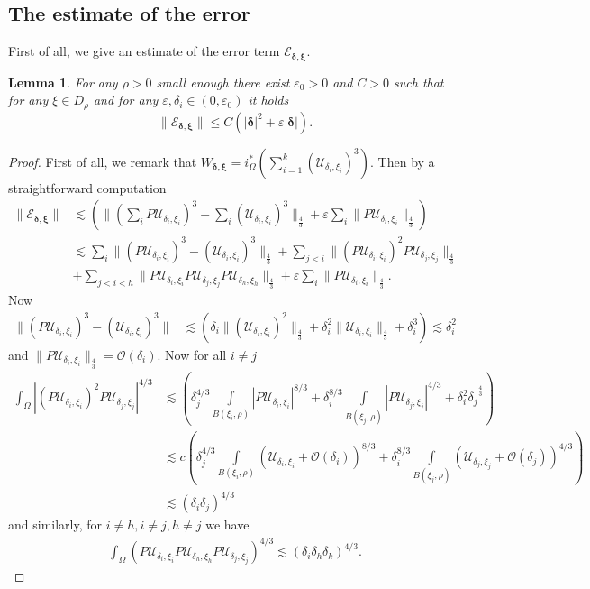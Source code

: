 \documentclass[11pt,a4paper]{amsart}
\newcommand{\e}{\varepsilon}
\renewcommand{\d }{\delta }
\renewcommand{\O}{\mathcal{O}}
\newcommand{\Uj}{{\mathcal{U}_{\delta_j, \xi_j}}}
\newcommand{\Ui}{{\mathcal{U}_{\delta_i, \xi_i}}}
\newcommand{\Uh}{{\mathcal{U}_{\delta_h, \xi_h}}}
\newtheorem{lemma}[theorem]{Lemma}
\theoremstyle{definition}
\renewcommand{\(}{\left(}
\renewcommand{\)}{\right)}
\begin{document}
\subsection{The estimate of the error}
First of all, we give an estimate of the error term $ \mathcal{E}_{\pmb{\d}, \pmb{\xi}}$.
\begin{lemma}
For any $\rho>0$ small enough there exist $\varepsilon_{0}>0$ and $C>0$ such that for any $\xi \in D_\rho$ and for any $\varepsilon, \delta_i \in (0,\varepsilon_{0})$ it holds 
\begin{equation*}
\| \mathcal{E}_{\pmb{\d}, \pmb{\xi}} \| \leq C\( |\pmb{\delta}|^{2}+\e|\pmb{\d}|\).
\end{equation*}
\end{lemma}
\begin{proof}  
First of all, we remark that
$W_{\pmb{\d},\pmb{\xi}}={i}^*_\Omega\left(\sum\limits_{i=1}^k  (\Ui)^3\right).$ Then by a straightforward computation  
		\begin{align*}
\|\mathcal{E}_{\pmb{\d}, \pmb{\xi}} \| &\lesssim\left( \| (\sum_i  P\Ui)^3-\sum_i (\Ui)^3\|_{\frac 43} + \e\sum_i \|P\Ui\|_{\frac 43}\right)\\
&\lesssim  \sum_i \|(P\Ui)^3-(\Ui)^3\|_{\frac 43} + \sum_{j<i} \| (P\Ui)^2 P\Uj \|_{{\frac 43}}\\&+\sum_{j< i<h} \| P\Ui P\Uj P\Uh\|_{{\frac 43}}  + \e\sum_i \|P\Ui\|_{\frac 43}.
		\end{align*}
Now
	\begin{align*}
		\|(P\Ui)^3-(\Ui)^3\| &\lesssim \left(\d_i \|(\Ui)^2\|_{\frac 43} + \d_i^2\|\Ui\|_{\frac 43} + \d_i^3\right) \lesssim \d_i^2 
	\end{align*}
and $\|P\Ui\|_{\frac 43}= \O(\d_i)$.
Now for all $i \neq j$ $$\begin{aligned}
	\int_\Omega |(P\Ui)^2 P\Uj|^{4/3} &\lesssim \left(\d_j^{4/3} \int\limits_{ B(\xi_i,\rho)} |P\Ui|^{8/3} + \d_i^{8/3} \int\limits_{ B(\xi_j,\rho)} |P\Uj|^{4/3} + {\d_i^2\d_j}^{\frac 43} \right) \\&\lesssim c\left(\d_j^{4/3} \int\limits_{ B(\xi_i,\rho)} (\Ui+\O(\d_i))^{8/3} + \d_i^{8/3} \int\limits_{ B(\xi_j,\rho)} (\Uj+\O(\d_j))^{4/3} \right)\\&\lesssim \left(\d_i\d_j\right)^{4/3}
\end{aligned}$$
and similarly, for $i\neq h, i\neq j, h\neq j$ we have \begin{align*}
	\int_\Omega \left( P\Ui P\Uh P\Uj \right)^{4/3} \lesssim (\d_i\d_h\d_k)^{4/3} .
\end{align*} 
	\end{proof}
\end{document}
